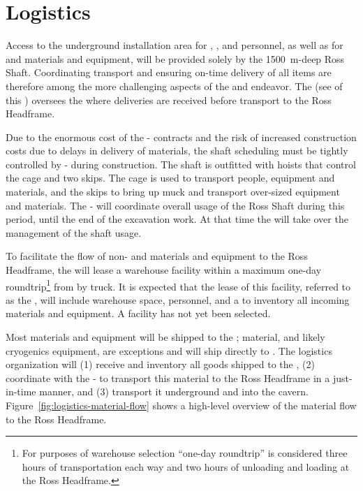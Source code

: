 \section{Logistics}
\label{sec:fdsp-tc-log}

Access to the underground installation area for ,   , and  personnel, as well as for   and   materials and equipment, will be provided solely by the \SI{1500}{m}-deep Ross Shaft. Coordinating transport and ensuring on-time delivery of all items are therefore among the more challenging aspects of the  and  endeavor. 
The  (see \tcchjpo %
of this ) oversees the  where deliveries are received before transport to the Ross Headframe. 

Due to the enormous cost of the - contracts and the risk of increased construction costs due to delays in delivery of materials, the shaft scheduling must be tightly controlled by - during construction.
The shaft is outfitted with hoists that control the cage and two skips. The cage is used to transport people, equipment and materials, and the skips to bring up muck and transport over-sized equipment and materials. The -  will coordinate overall usage of the Ross Shaft during this period, until the end of the excavation work. At that  time the  will take over the management of the shaft usage.


To facilitate the flow of non-  and  materials and equipment to the Ross Headframe, the  will lease a warehouse facility within a maximum one-day roundtrip\footnote{For purposes of warehouse selection ``one-day roundtrip'' is considered three hours of transportation each way and two hours of unloading and loading at the Ross Headframe.} from  by truck. 
It is expected that the lease of this facility, referred to as the , will include warehouse space, personnel, and a  to inventory all incoming materials and equipment. 
A facility has not yet been selected. 


Most materials and equipment will be shipped to the ;  material, and likely cryogenics equipment, are exceptions and will ship directly to . 
The  logistics  organization will (1) receive and inventory all  goods shipped to the , (2) coordinate with the -  to transport this material to the Ross Headframe in a just-in-time manner, and (3) transport it underground and into the cavern. 
Figure~\ref{fig:logistics-material-flow} shows a high-level overview of the material flow to the Ross Headframe.

